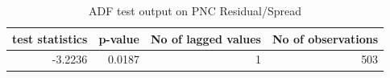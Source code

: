 \begin{table}[!ht] 
\centering 
\resizebox{0.7\textwidth}{!} { 
\begin{tabular}{rrrr}
\toprule
test statistics & p-value & No of lagged values & No of observations \\
\midrule
-3.2236 & 0.0187 & 1 & 503 \\
\bottomrule
\end{tabular}} 
\caption {ADF test output on PNC Residual/Spread} 
\label {adf_pnc_bac} 
\end{table} 
\FloatBarrier